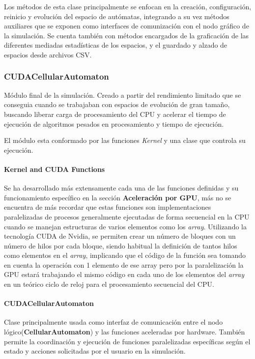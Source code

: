 \documentclass[]{article}
\begin{document}
			Los métodos de esta clase principalmente se enfocan en la creación, configuración, reinicio y evolución del espacio de autómatas, integrando a su vez métodos auxiliares que se exponen como interfaces de comunización con el nodo gráfico de la simulación.
			Se cuenta también con métodos encargados de la graficación de las diferentes mediadas estadísticas de los espacios, y el guardado y alzado de espacios desde archivos CSV.
			
			
			
		\subsubsection{CUDACellularAutomaton}
			Módulo final de la simulación. Creado a partir del rendimiento limitado que se conseguia cuando se trabajaban con espacios de evolución de gran tamaño, buscando liberar carga de procesamiento del CPU y acelerar el tiempo de ejecución de algoritmos pesados en procesamiento y tiempo de ejecución.
			
			El módulo esta conformado por las funciones \textit{Kernel} y una clase que controla su ejecución.
			
			\paragraph{Kernel and CUDA Functions}
				Se ha desarrollado más extensamente cada una de las funciones definidas y su funcionamiento específico en la sección \textbf{Aceleración por GPU}, más no se encuentra de más recordar que estas funciones son implementaciones paralelizadas de procesos generalmente ejecutadas de forma secuencial en la CPU cuando se manejan estructuras de varios elementos como los \textit{array}. Utilizando la tecnología CUDA de Nvidia, se permiten crear un número de bloques con un número de hilos por cada bloque, siendo habitual la definición de tantos hilos como elementos en el \textit{array}, implicando que el código de la función sea tomando en cuenta la operación con 1 elemento de ese array pero por la paralelización la GPU estará trabajando el mismo código en cada uno de los elementos del \textit{array} en un teórico ciclo de reloj para el procesamiento secuencial del CPU.
			
			\paragraph{CUDACellularAutomaton}
				Clase principalmente usada como interfaz de comunicación entre el nodo lógico(\textbf{CellularAutomaton}) y las funciones aceleradas por hardware. También permite la coordinación y ejecución de funciones paralelizadas específicas según el estado y acciones solicitadas por el usuario en la simulación.
			
\end{document}
